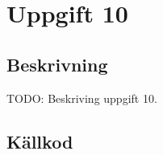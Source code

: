\section{Uppgift 10}\label{uppgift-10}

\subsection{Beskrivning}
TODO: Beskriving uppgift 10.

\subsection{Källkod}\label{uppgift-10_src}
\inputminted[]{java}{../src/Lab1Uppg10.java}
